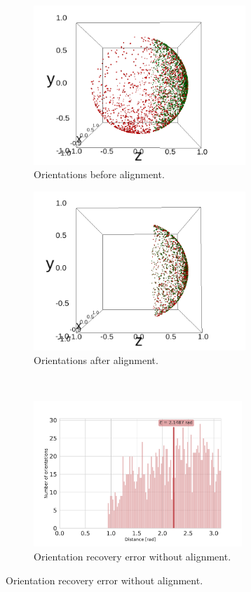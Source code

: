 \begin{figure}[ht!]
    \centering
    \begin{subfigure}[b]{0.45\textwidth}
        \includegraphics[height=6cm]{figures/coverage_alignment_before}
        \caption{Orientations before alignment.}
    \end{subfigure}
    \hfill
    \begin{subfigure}[b]{0.50\textwidth}
    \centering
        \includegraphics[height=6cm]{figures/coverage_alignment_after}
        \caption{Orientations after alignment.}
    \end{subfigure}
    \\
    \begin{subfigure}[b]{0.45\textwidth}
        \includegraphics[height=5.5cm]{figures/5j0n_perfect_angle_ralignment_before}
        \caption{Orientation recovery error without alignment.}

\end{subfigure}
\end{figure}
